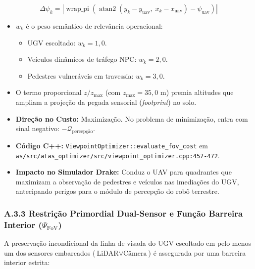 \documentclass[
  brazilian,
  a4paper]{article}
\providecommand{\tightlist}{%
  \setlength{\itemsep}{0pt}\setlength{\parskip}{0pt}}
\begin{document}
\[\Delta\psi_k = \left|\operatorname{wrap\_pi}\left(\operatorname{atan2}\left(y_k - y_{\text{uav}}, \; x_k - x_{\text{uav}}\right) - \psi_{\text{uav}}\right)\right|\]

\begin{itemize}
\tightlist
\item
  \(w_k\) é o peso semântico de relevância operacional:

  \begin{itemize}
  \tightlist
  \item
    UGV escoltado: \(w_k = 1{,}0\).
  \item
    Veículos dinâmicos de tráfego NPC: \(w_k = 2{,}0\).
  \item
    Pedestres vulneráveis em travessia: \(w_k = 3{,}0\).
  \end{itemize}
\item
  O termo proporcional \(z / z_{\text{max}}\) (com
  \(z_{\text{max}} = 35{,}0\text{ m}\)) premia altitudes que ampliam a
  projeção da pegada sensorial (\emph{footprint}) no solo.
\item
  \textbf{Direção no Custo:} Maximização. No problema de minimização,
  entra com sinal negativo: \(-\mathcal{Q}_{\text{percepção}}\).
\item
  \textbf{Código C++:} \texttt{ViewpointOptimizer:\allowbreak{}:\allowbreak{}evaluate\_\allowbreak{}fov\_\allowbreak{}cost}
  em
  \texttt{ws/\allowbreak{}src/\allowbreak{}atas\_\allowbreak{}optimizer/\allowbreak{}src/\allowbreak{}viewpoint\_\allowbreak{}optimizer.\allowbreak{}cpp:\allowbreak{}457-472}.
\item
  \textbf{Impacto no Simulador Drake:} Conduz o UAV para quadrantes que
  maximizam a observação de pedestres e veículos nas imediações do UGV,
  antecipando perigos para o módulo de percepção do robô terrestre.
\end{itemize}

\subsubsection{\texorpdfstring{A.3.3 Restrição Primordial Dual-Sensor e
Função Barreira Interior
(\(\Psi_{\text{FoV}}\))}{A.3.3 Restrição Primordial Dual-Sensor e Função Barreira Interior (\textbackslash Psi\_\{\textbackslash text\{FoV\}\})}}\label{a.3.3-restriuxe7uxe3o-primordial-dual-sensor-e-funuxe7uxe3o-barreira-interior-psi_textfov}

A preservação incondicional da linha de visada do UGV escoltado em pelo
menos um dos sensores embarcados (\(\text{LiDAR} \lor \text{Câmera}\)) é
assegurada por uma barreira interior estrita:
\end{document}
